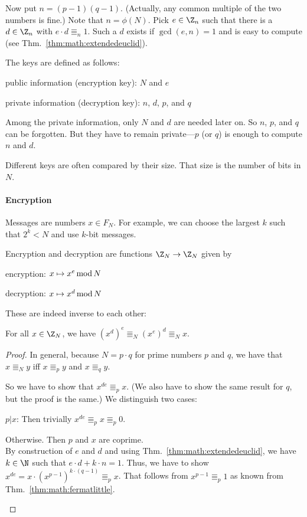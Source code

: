 Now put $n=(p-1)(q-1)$. (Actually, any common multiple of the two numbers is fine.)
Note that $n=\phi(N)$.
Pick $e\in \Z_n$ such that there is a $d\in\Z_n$ with $e\cdot d\Equiv_n 1$.
Such a $d$ exists if $\gcd(e,n)=1$ and is easy to compute (see Thm.~\ref{thm:math:extendedeuclid}).

The keys are defined as follows:
\begin{compactitem}
 \item public information (encryption key): $N$ and $e$
 \item private information (decryption key): $n$, $d$, $p$, and $q$
\end{compactitem}
Among the private information, only $N$ and $d$ are needed later on.
So $n$, $p$, and $q$ can be forgotten.
But they have to remain private---$p$ (or $q$) is enough to compute $n$ and $d$.

Different keys are often compared by their size.
That size is the number of bits in $N$.

\paragraph{Encryption}
Messages are numbers $x\in F_N$.
For example, we can choose the largest $k$ such that $2^k<N$ and use $k$-bit messages.

Encryption and decryption are functions $\Z_N\to \Z_N$ given by
\begin{compactitem}
 \item encryption: $x\mapsto x^e\mathop{\mathrm{mod}} N$
 \item decryption: $x\mapsto x^d\mathop{\mathrm{mod}} N$
\end{compactitem}

These are indeed inverse to each other:

\begin{theorem}
For all $x\in \Z_N$, we have $(x^d)^e\Equiv_N (x^e)^d \Equiv_N x$.
\end{theorem}
\begin{proof}
In general, because $N=p\cdot q$ for prime numbers $p$ and $q$, we have that $x\Equiv_N y$ iff $x\Equiv_p y$ and $x\Equiv_q y$.

So we have to show that $x^{de}\Equiv_p x$.
(We also have to show the same result for $q$, but the proof is the same.)
We distinguish two cases:
\begin{compactitem}
\item $p|x$: Then trivially $x^{de}\Equiv_p x\Equiv_p 0$.
\item Otherwise. Then $p$ and $x$ are coprime.\\
   By construction of $e$ and $d$ and using Thm.~\ref{thm:math:extendedeuclid}, we have $k\in\N$ such that $e\cdot d+k\cdot n=1$.
   Thus, we have to show $x^{de}=x\cdot (x^{p-1})^{k\cdot(q-1)}\Equiv_p x$.
   That follows from $x^{p-1}\Equiv_p 1$ as known from Thm.~\ref{thm:math:fermatlittle}.
\end{compactitem}
\end{proof}

